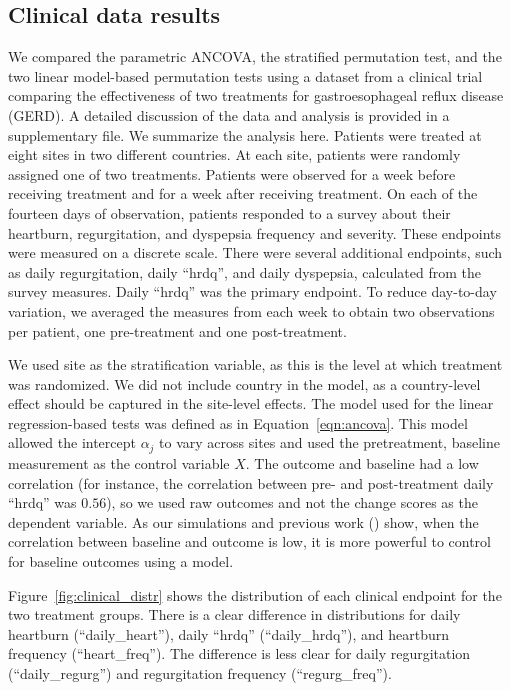 \documentclass[12pt]{article}
\begin{document}
\subsection{Clinical data results}
We compared the parametric ANCOVA, the stratified permutation test, and the two linear model-based permutation tests using a dataset from a clinical trial comparing the effectiveness of two treatments for gastroesophageal reflux disease (GERD).
A detailed discussion of the data and analysis is provided in a supplementary file.
We summarize the analysis here.
Patients were treated at eight sites in two different countries.
At each site, patients were randomly assigned one of two treatments.
Patients were observed for a week before receiving treatment and for a week after receiving treatment.
On each of the fourteen days of observation, patients responded to a survey about their heartburn, regurgitation, and dyspepsia frequency and severity.
These endpoints were measured on a discrete scale.
There were several additional endpoints, such as daily regurgitation, daily ``hrdq'', and daily dyspepsia, calculated from the survey measures.
Daily ``hrdq'' was the primary endpoint.
To reduce day-to-day variation, we averaged the measures from each week to obtain two observations per patient, one pre-treatment and one post-treatment.

We used site as the stratification variable, as this is the level at which treatment was randomized.
We did not include country in the model, as a country-level effect should be captured in the site-level effects.
The model used for the linear regression-based tests was defined as in Equation~\ref{eqn:ancova}.
This model allowed the intercept $\alpha_j$ to vary across sites and used the pretreatment, baseline measurement as the control variable $X$.
The outcome and baseline had a low correlation (for instance, the correlation between pre- and post-treatment daily ``hrdq'' was $0.56$), so we used raw outcomes and not the change scores as the dependent variable. 
As our simulations and previous work (\cite{frison_repeated_1992}) show, when the correlation between baseline and outcome is low, it is more powerful to control for baseline outcomes using a model.

Figure~\ref{fig:clinical_distr} shows the distribution of each clinical endpoint for the two treatment groups.
There is a clear difference in distributions for daily heartburn (``daily\_heart''), daily ``hrdq'' (``daily\_hrdq''), and heartburn frequency (``heart\_freq'').
The difference is less clear for daily regurgitation (``daily\_regurg'') and regurgitation frequency (``regurg\_freq'').
\end{document}

